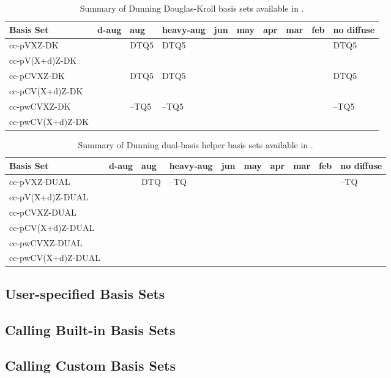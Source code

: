 \begin{table}[!htbp]
\begin{footnotesize}
\caption{Summary of Dunning Douglas-Kroll basis sets available in \PSIfour.} \label{table:basisDunningDK}
\parsep 5pt
\begin{center}
\begin{tabular}{llllllllll}
\hline\hline
Basis Set            & d-aug & aug & heavy-aug\cite{basisnote1} & jun & may & apr & mar & feb & no diffuse \\ 
\hline
cc-pVXZ-DK           &  & DTQ5  & DTQ5  &  &  &  &  &  & DTQ5  \\
cc-pV(X+d)Z-DK       &  &       &       &  &  &  &  &  &       \\
cc-pCVXZ-DK          &  & DTQ5  & DTQ5  &  &  &  &  &  & DTQ5  \\
cc-pCV(X+d)Z-DK      &  &       &       &  &  &  &  &  &       \\
cc-pwCVXZ-DK         &  & --TQ5 & --TQ5 &  &  &  &  &  & --TQ5 \\
cc-pwCV(X+d)Z-DK     &  &       &       &  &  &  &  &  &       \\
\hline\hline
\end{tabular}
\end{center}
\end{footnotesize}
\end{table}


\begin{table}[!htbp]
\begin{footnotesize}
\caption{Summary of Dunning dual-basis helper basis sets available in \PSIfour.} \label{table:basisDunningDUAL}
\parsep 5pt
\begin{center}
\begin{tabular}{llllllllll}
\hline\hline
Basis Set            & d-aug & aug & heavy-aug\cite{basisnote1} & jun & may & apr & mar & feb & no diffuse \\ 
\hline
cc-pVXZ-DUAL         &  & DTQ & --TQ &  &  &  &  &  & --TQ \\
cc-pV(X+d)Z-DUAL     &  &     &      &  &  &  &  &  &      \\
cc-pCVXZ-DUAL        &  &     &      &  &  &  &  &  &      \\
cc-pCV(X+d)Z-DUAL    &  &     &      &  &  &  &  &  &      \\
cc-pwCVXZ-DUAL       &  &     &      &  &  &  &  &  &      \\
cc-pwCV(X+d)Z-DUAL   &  &     &      &  &  &  &  &  &      \\
\hline\hline
\end{tabular}
\end{center}
\end{footnotesize}
\end{table}

\subsection{User-specified Basis Sets}
\subsection{Calling Built-in Basis Sets}
\subsection{Calling Custom Basis Sets}

